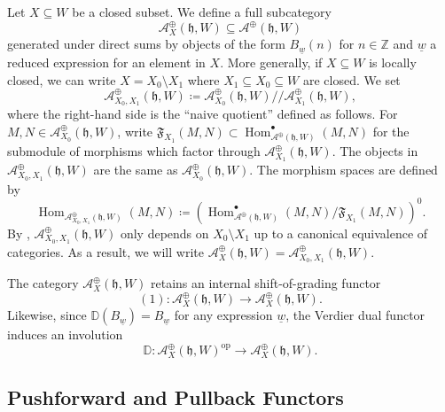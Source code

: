 \documentclass{amsart}
\newcommand{\Z}{\mathbb{Z}}
\newcommand{\scrA}{\mathcal{A}}
\newcommand{\uw}{\underline{w}}
\DeclareMathOperator{\Hom}{Hom}
\newcommand{\fr}[1]{\mathfrak{#1}}
\DeclareMathOperator{\op}{op}
\newcommand{\DD}{\mathbb{D}}
\theoremstyle{definition}
\begin{document}
        Let $X \subseteq W$ be a closed subset. We define a full subcategory
        \[\scrA^{\oplus}_{ X} (\fr{h}, W) \subseteq \scrA^{\oplus} (\fr{h}, W)\]
        generated under direct sums by objects of the form $B_{\uw} (n)$ for $n \in \Z$ and $\uw$ a reduced expression for an element in $X$.
        More generally, if $X \subseteq W$ is locally closed, we can write $X = X_0 \setminus X_1$ where $X_1 \subseteq X_0 \subseteq W$ are closed.
        We set
        \[\scrA^{\oplus}_{ X_0, X_1} (\fr{h}, W) \coloneq \scrA^{\oplus}_{ X_0} (\fr{h}, W) /\!\!/ \scrA^{\oplus}_{ X_1} (\fr{h}, W),\]
        where the right-hand side is the ``naive quotient'' defined as follows. For $M, N \in \scrA^{\oplus}_{ X_0} (\fr{h}, W)$, write $\mathfrak{F}_{X_1} (M,N) \subset \Hom_{\scrA^{\oplus} (\fr{h},W)}^{\bullet} (M,N)$ for the submodule of morphisms which factor through $\scrA^{\oplus}_{ X_1} (\fr{h}, W)$.
        The objects in $\scrA^{\oplus}_{ X_0, X_1} (\fr{h}, W)$ are the same as $\scrA^{\oplus}_{ X_0} (\fr{h}, W)$. The morphism spaces are defined by
        \[ \Hom_{\scrA_{X_0, X_1}^{\oplus} (\fr{h},W)} (M,N) \coloneq \left(\Hom_{\scrA^{\oplus} (\fr{h},W)}^{\bullet} (M,N) / \mathfrak{F}_{X_1} (M,N) \right)^0. \]
        By \cite[Lemma 4.3]{ARV}, $\scrA^{\oplus}_{ X_0, X_1} (\fr{h}, W)$ only depends on $X_0 \setminus X_1$ up to a canonical equivalence of categories. 
        As a result, we will write $\scrA^{\oplus}_{ X} (\fr{h}, W) = \scrA^{\oplus}_{ X_0, X_1} (\fr{h}, W)$.
        
        The category $\scrA_X^{\oplus} (\fr{h}, W)$ retains an internal shift-of-grading functor
        \[(1) : \scrA_X^{\oplus} (\fr{h}, W) \to \scrA_X^{\oplus} (\fr{h}, W).\]
        Likewise, since $\DD (B_{\uw}) = B_{\uw}$ for any expression $\uw$, the Verdier dual functor induces an involution 
        \[\DD : \scrA^{\oplus}_{ X} (\fr{h}, W)^{\op} \to  \scrA^{\oplus}_{ X} (\fr{h}, W).\] 

        \subsection{Pushforward and Pullback Functors}
\end{document}
